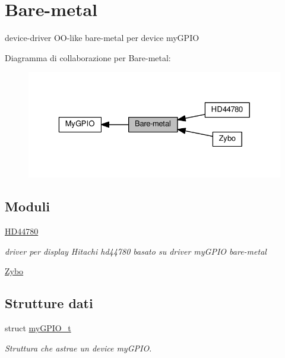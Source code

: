 \hypertarget{group__bare-metal}{}\section{Bare-\/metal}
\label{group__bare-metal}


device-\/driver O\+O-\/like bare-\/metal per device my\+G\+P\+IO  


Diagramma di collaborazione per Bare-\/metal\+:\nopagebreak
\begin{figure}[H]
\begin{center}
\leavevmode
\includegraphics[width=329pt]{group__bare-metal}
\end{center}
\end{figure}
\subsection*{Moduli}
\begin{DoxyCompactItemize}
\item 
\hyperlink{group___h_d44780}{H\+D44780}
\begin{DoxyCompactList}\small\item\em driver per display Hitachi hd44780 basato su driver my\+G\+P\+IO bare-\/metal \end{DoxyCompactList}\item 
\hyperlink{group___zybo}{Zybo}
\end{DoxyCompactItemize}
\subsection*{Strutture dati}
\begin{DoxyCompactItemize}
\item 
struct \hyperlink{structmy_g_p_i_o__t}{my\+G\+P\+I\+O\+\_\+t}
\begin{DoxyCompactList}\small\item\em Struttura che astrae un device my\+G\+P\+IO. \end{DoxyCompactList}\end{DoxyCompactItemize}

